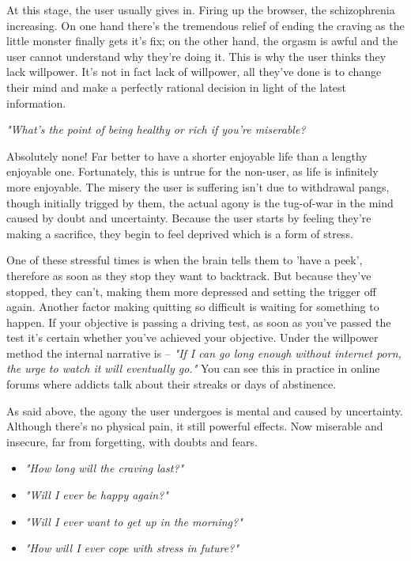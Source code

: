 \documentclass[easypeasy.tex]{subfiles}
\begin{document}
At this stage, the user usually gives in. Firing up the browser, the schizophrenia increasing. On one hand there's the tremendous relief of ending the craving as the little monster finally gets it's fix; on the other hand, the orgasm is awful and the user cannot understand why they're doing it. This is why the user thinks they lack willpower. It's not in fact lack of willpower, all they've done is to change their mind and make a perfectly rational decision in light of the latest information.
  
  \textit{"What's the point of being healthy or rich if you're miserable?}

Absolutely none! Far better to have a shorter enjoyable life than a lengthy enjoyable one. Fortunately, this is untrue for the non-user, as life is infinitely more enjoyable. The misery the user is suffering isn't due to withdrawal pangs, though initially trigged by them, the actual agony is the tug-of-war in the mind caused by doubt and uncertainty. Because the user starts by feeling they're making a sacrifice, they begin to feel deprived which is a form of stress.

One of these stressful times is when the brain tells them to 'have a peek', therefore as soon as they stop they want to backtrack. But because they've stopped, they can't, making them more depressed and setting the trigger off again. Another factor making quitting so difficult is waiting for something to happen. If your objective is passing a driving test, as soon as you've passed the test it's certain whether you've achieved your objective. Under the willpower method the internal narrative is -- \textit{"If I can go long enough without internet porn, the urge to watch it will eventually go."} You can see this in practice in online forums where addicts talk about their streaks or days of abstinence.

As said above, the agony the user undergoes is mental and caused by uncertainty. Although there's no physical pain, it still powerful effects. Now miserable and insecure, far from forgetting, with doubts and fears.

\begin{itemize}
  \item \textit{"How long will the craving last?"}
  \item \textit{"Will I ever be happy again?"}
  \item \textit{"Will I ever want to get up in the morning?"}
  \item \textit{"How will I ever cope with stress in future?"}
\end{itemize}
\end{document}
